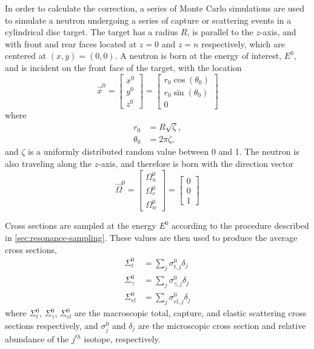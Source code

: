 In order to calculate the correction, a series of Monte Carlo simulations are used to simulate a neutron undergoing a series of capture or scattering events in a cylindrical disc target. The target has a radius $R$, is parallel to the $z$-axis, and with front and rear faces located at $z=0$ and $z=n$ respectively, which are centered at $(x,y)=(0,0)$. A neutron is born at the energy of interest, $E^0$, and is incident on the front face of the target, with the location
\begin{equation}
    \label{eq:incident-neutron-location}
    \overrightarrow{x}^0 = \begin{bmatrix}
        x^0 \\
        y^0 \\
        z^0
    \end{bmatrix} =
    \begin{bmatrix} 
        r_0\cos{\left( \theta_0 \right)} \\
        r_0\sin{\left( \theta_0 \right)} \\
        0
    \end{bmatrix}
\end{equation}
where
\begin{align*}
    r_0 &= R\sqrt{\zeta}, \\
    \theta_0 &= 2\pi\zeta,
\end{align*}
and $\zeta$ is a uniformly distributed random value between 0 and 1. The neutron is also traveling along the $z$-axis, and therefore is born with the direction vector
\begin{equation}
    \label{eq:incident-neutron-location}
    \overrightarrow{\Omega}^0 = \begin{bmatrix}
        \Omega^0_u \\
        \Omega^0_v \\
        \Omega^0_w
    \end{bmatrix} =
    \begin{bmatrix}
        0 \\
        0 \\
        1
    \end{bmatrix}
\end{equation}

Cross sections are sampled at the energy $E^0$ according to the procedure described in \autoref{sec:resonance-sampling}. These values are then used to produce the average cross sections,
\begin{align}
    \label{eq:average-cross-sections}
    \Sigma_{t}^{0} &= \sum_{j} \sigma_{t,j}^{0} \delta_{j} \\
    \Sigma_{\gamma}^{0} &= \sum_{j} \sigma_{\gamma,j}^{0} \delta_{j} \\
    \Sigma_{el}^{0} &= \sum_{j} \sigma_{el,j}^{0} \delta_{j}
\end{align}
where $\Sigma_{t}^0$, $\Sigma_{\gamma}^0$, $\Sigma_{el}^0$ are the macroscopic total, capture, and elastic scattering cross sections respectively, and $\sigma_{j}^0$ and $\delta_{j}$ are the microscopic cross section and relative abundance of the $j^{th}$ isotope, respectively.

